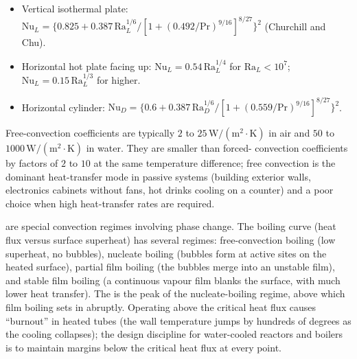 \begin{itemize}[leftmargin=*]
  \item Vertical isothermal plate: $\text{Nu}_L = \{0.825 + 0.387\,
    \text{Ra}_L^{1/6}/[1 + (0.492/\text{Pr})^{9/16}]^{8/27}\}^2$
    (Churchill and Chu).
  \item Horizontal hot plate facing up: $\text{Nu}_L = 0.54\,
    \text{Ra}_L^{1/4}$ for $\text{Ra}_L < 10^7$; $\text{Nu}_L = 0.15\,
    \text{Ra}_L^{1/3}$ for higher.
  \item Horizontal cylinder: $\text{Nu}_D = \{0.6 + 0.387\,
    \text{Ra}_D^{1/6}/[1 + (0.559/\text{Pr})^{9/16}]^{8/27}\}^2$.
\end{itemize}

Free-convection coefficients are typically $2$ to $25\,\text{W}/(
\text{m}^2\cdot\si{\kelvin})$ in air and $50$ to $1000\,\text{W}/(
\text{m}^2\cdot\si{\kelvin})$ in water. They are smaller than forced-
convection coefficients by factors of $2$ to $10$ at the same
temperature difference; free convection is the dominant heat-transfer
mode in passive systems (building exterior walls, electronics
cabinets without fans, hot drinks cooling on a counter) and a poor
choice when high heat-transfer rates are required.

 are special convection regimes
involving phase change. The boiling curve (heat flux versus surface
superheat) has several regimes: free-convection boiling (low
superheat, no bubbles), nucleate boiling (bubbles form at active
sites on the heated surface), partial film boiling (the bubbles
merge into an unstable film), and stable film boiling (a continuous
vapour film blanks the surface, with much lower heat transfer). The
 is the peak of the nucleate-boiling
regime, above which film boiling sets in abruptly. Operating above
the critical heat flux causes ``burnout'' in heated tubes (the wall
temperature jumps by hundreds of degrees as the cooling collapses);
the design discipline for water-cooled reactors and boilers is to
maintain margins below the critical heat flux at every point.



